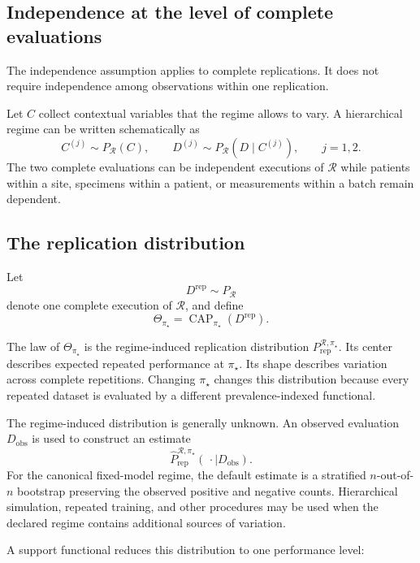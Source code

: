 \documentclass[11pt]{article}
\newcommand{\CAP}{\operatorname{CAP}}
\newcommand{\Regime}{\mathcal{R}}
\newcommand{\Tpi}{\CAP_{\pi_\star}}
\newcommand{\PRep}{P_{\mathrm{rep}}^{\Regime,\pi_\star}}
\newcommand{\PRepHat}{\widehat{P}_{\mathrm{rep}}^{\Regime,\pi_\star}}
\theoremstyle{remark}
\begin{document}
\subsection{Independence at the level of complete evaluations}

The independence assumption applies to complete replications. It does not require independence among observations within one replication.

Let $C$ collect contextual variables that the regime allows to vary. A hierarchical regime can be written schematically as
\[
C^{(j)}\sim P_{\Regime}(C),
\qquad
D^{(j)}\sim P_{\Regime}(D\mid C^{(j)}),
\qquad j=1,2.
\]
The two complete evaluations can be independent executions of $\Regime$ while patients within a site, specimens within a patient, or measurements within a batch remain dependent.

\subsection{The replication distribution}

Let
\[
D^{\mathrm{rep}}\sim P_{\Regime}
\]
denote one complete execution of $\Regime$, and define
\begin{equation}
\Theta_{\pi_\star}
=
\Tpi(D^{\mathrm{rep}}).
\label{eq:Theta}
\end{equation}

The law of $\Theta_{\pi_\star}$ is the regime-induced replication distribution $\PRep$. Its center describes expected repeated performance at $\pi_\star$. Its shape describes variation across complete repetitions. Changing $\pi_\star$ changes this distribution because every repeated dataset is evaluated by a different prevalence-indexed functional.

The regime-induced distribution is generally unknown. An observed evaluation $D_{\mathrm{obs}}$ is used to construct an estimate
\[
\PRepHat(\,\cdot\mid D_{\mathrm{obs}}).
\]
For the canonical fixed-model regime, the default estimate is a stratified $n$-out-of-$n$ bootstrap preserving the observed positive and negative counts. Hierarchical simulation, repeated training, and other procedures may be used when the declared regime contains additional sources of variation.

A support functional reduces this distribution to one performance level:
\begin{center}
\end{center}
\end{document}
